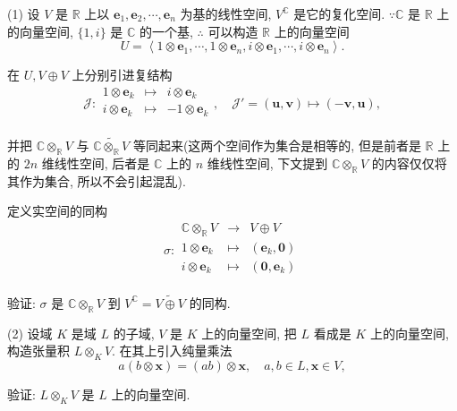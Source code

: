 \documentclass{ctexart}
\begin{document}
\begin{exercise}%
    (1) 设 $V$ 是 $\mathbb{R}$ 上以 $\boldsymbol{e}_1,\boldsymbol{e}_2,\cdots,\boldsymbol{e}_n$ 为基的线性空间, $V^\mathbb{C}$ 是它的复化空间. $\because\mathbb{C}$ 是 $\mathbb{R}$ 上的向量空间, $\{1,i\}$ 是 $\mathbb{C}$ 的一个基, $\therefore$ 可以构造 $\mathbb{R}$ 上的向量空间
    \[U=\left<1\otimes\boldsymbol{e}_1,\cdots,1\otimes\boldsymbol{e}_n,i\otimes\boldsymbol{e}_1,\cdots,i\otimes\boldsymbol{e}_n\right>.\]

    在 $U,V\oplus V$ 上分别引进复结构
    \[\mathcal{J}:\begin{array}{rcl}
        1\otimes\boldsymbol{e}_k & \mapsto & i\otimes\boldsymbol{e}_k \\
        i\otimes\boldsymbol{e}_k & \mapsto & -1\otimes\boldsymbol{e}_k \\
    \end{array},\quad\mathcal{J}'=(\boldsymbol{u},\boldsymbol{v})\mapsto(-\boldsymbol{v},\boldsymbol{u}),\]

    并把 $\mathbb{C}\otimes_\mathbb{R}V$ 与 $\widetilde{\mathbb{C}\otimes_\mathbb{R}V}$ 等同起来(这两个空间作为集合是相等的, 但是前者是 $\mathbb{R}$ 上的 $2n$ 维线性空间, 后者是 $\mathbb{C}$ 上的 $n$ 维线性空间, 下文提到 $\mathbb{C}\otimes_\mathbb{R}V$ 的内容仅仅将其作为集合, 所以不会引起混乱).

    定义实空间的同构
    \[\sigma:\begin{array}{rcl}
        \mathbb{C}\otimes_\mathbb{R}V & \to & V\oplus V \\
        1\otimes\boldsymbol{e}_k & \mapsto & (\boldsymbol{e}_k,\boldsymbol{0}) \\
        i\otimes\boldsymbol{e}_k & \mapsto & (\boldsymbol{0},\boldsymbol{e}_k) \\
    \end{array}\]
    
    验证: $\sigma$ 是 $\mathbb{C}\otimes_\mathbb{R}V$ 到 $V^\mathbb{C}=\widetilde{V\oplus V}$ 的同构.

    (2) 设域 $K$ 是域 $L$ 的子域, $V$ 是 $K$ 上的向量空间, 把 $L$ 看成是 $K$ 上的向量空间, 构造张量积 $L\otimes_KV$. 在其上引入纯量乘法
    \[a(b\otimes\boldsymbol{x})=(ab)\otimes\boldsymbol{x},\quad a,b\in L,\boldsymbol{x}\in V,\]

    验证: $L\otimes_KV$ 是 $L$ 上的向量空间.
\end{exercise}
\end{document}
